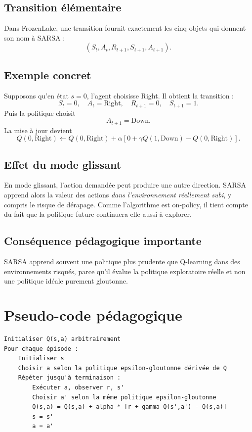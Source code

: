 \documentclass[11pt,a4paper]{article}
\begin{document}
\subsection{Transition élémentaire}

Dans FrozenLake, une transition fournit exactement les cinq objets qui donnent son nom à SARSA :
\[
(S_t,A_t,R_{t+1},S_{t+1},A_{t+1}).
\]

\subsection{Exemple concret}

Supposons qu'en état $s=0$, l'agent choisisse Right. Il obtient la transition :
\[
S_t=0,\quad A_t=\text{Right},\quad R_{t+1}=0,\quad S_{t+1}=1.
\]
Puis la politique choisit
\[
A_{t+1}=\text{Down}.
\]
La mise à jour devient
\[
Q(0,\text{Right}) \leftarrow Q(0,\text{Right}) + \alpha\left[0+\gamma Q(1,\text{Down}) - Q(0,\text{Right})\right].
\]

\subsection{Effet du mode glissant}

En mode glissant, l'action demandée peut produire une autre direction. SARSA apprend alors la valeur des actions \emph{dans l'environnement réellement subi}, y compris le risque de dérapage. Comme l'algorithme est on-policy, il tient compte du fait que la politique future continuera elle aussi à explorer.

\subsection{Conséquence pédagogique importante}

SARSA apprend souvent une politique plus prudente que Q-learning dans des environnements risqués, parce qu'il évalue la politique exploratoire réelle et non une politique idéale purement gloutonne.

\section{Pseudo-code pédagogique}

\begin{verbatim}
Initialiser Q(s,a) arbitrairement
Pour chaque épisode :
    Initialiser s
    Choisir a selon la politique epsilon-gloutonne dérivée de Q
    Répéter jusqu'à terminaison :
        Exécuter a, observer r, s'
        Choisir a' selon la même politique epsilon-gloutonne
        Q(s,a) = Q(s,a) + alpha * [r + gamma Q(s',a') - Q(s,a)]
        s = s'
        a = a'
\end{verbatim}
\end{document}

